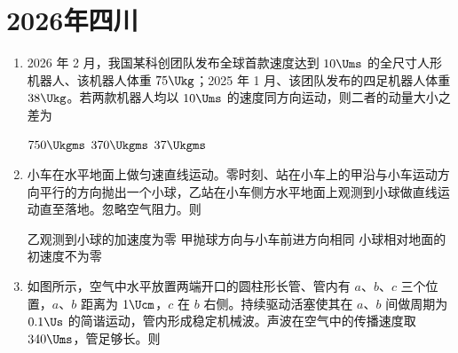 \documentclass[\gkver]{gaokaozhenti}
\begin{document}
\chapter{2026年四川}

\begin{enumerate}
\item
2026 年 2 月，我国某科创团队发布全球首款速度达到 $10 \Ums$ 的全尺寸人形机器人、该机器人体重 $75 \Ukg$；2025 年 1 月、该团队发布的四足机器人体重 $38 \Ukg$。若两款机器人均以 $10 \Ums$ 的速度同方向运动，则二者的动量大小之差为 

\fourchoices[answer=C]
{$1850 \Ukgms$}
{$750 \Ukgms$}
{$370 \Ukgms$}
{$37 \Ukgms$}

\item
小车在水平地面上做匀速直线运动。零时刻、站在小车上的甲沿与小车运动方向平行的方向抛出一个小球，乙站在小车侧方水平地面上观测到小球做直线运动直至落地。忽略空气阻力。则 

{乙观测到小球的加速度为零}
{甲抛球方向与小车前进方向相同}
{小球相对地面的初速度不为零}

\item
如图所示，空气中水平放置两端开口的圆柱形长管、管内有 $a$、$b$、$c$ 三个位置，$a$、$b$ 距离为 $1 \Ucm$，$c$ 在 $b$ 右侧。持续驱动活塞使其在 $a$、$b$ 间做周期为 $0.1 \Us$ 的简谐运动，管内形成稳定机械波。声波在空气中的传播速度取 $340 \Ums$，管足够长。则 


\end{enumerate}
\end{document}

